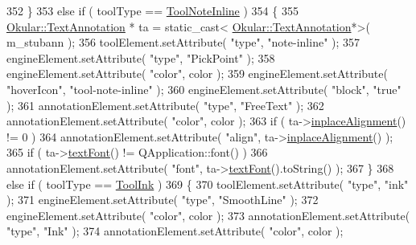 \begin{DoxyCode}
352     \}
353     \textcolor{keywordflow}{else} \textcolor{keywordflow}{if} ( toolType == \hyperlink{classEditAnnotToolDialog_ae4572c0cf4fc351cf03e4d86ef595a9ca198ea29d3ebd27d859c47c7d7e0499e2}{ToolNoteInline} )
354     \{
355         \hyperlink{classOkular_1_1TextAnnotation}{Okular::TextAnnotation} * ta = \textcolor{keyword}{static\_cast<}
      \hyperlink{classOkular_1_1TextAnnotation}{Okular::TextAnnotation}*\textcolor{keyword}{>}( m\_stubann );
356         toolElement.setAttribute( \textcolor{stringliteral}{"type"}, \textcolor{stringliteral}{"note-inline"} );
357         engineElement.setAttribute( \textcolor{stringliteral}{"type"}, \textcolor{stringliteral}{"PickPoint"} );
358         engineElement.setAttribute( \textcolor{stringliteral}{"color"}, color );
359         engineElement.setAttribute( \textcolor{stringliteral}{"hoverIcon"}, \textcolor{stringliteral}{"tool-note-inline"} );
360         engineElement.setAttribute( \textcolor{stringliteral}{"block"}, \textcolor{stringliteral}{"true"} );
361         annotationElement.setAttribute( \textcolor{stringliteral}{"type"}, \textcolor{stringliteral}{"FreeText"} );
362         annotationElement.setAttribute( \textcolor{stringliteral}{"color"}, color );
363         \textcolor{keywordflow}{if} ( ta->\hyperlink{classOkular_1_1TextAnnotation_ada96fce5c424867d6b48a8ae39a8cace}{inplaceAlignment}() != 0 )
364             annotationElement.setAttribute( \textcolor{stringliteral}{"align"}, ta->\hyperlink{classOkular_1_1TextAnnotation_ada96fce5c424867d6b48a8ae39a8cace}{inplaceAlignment}() );
365         \textcolor{keywordflow}{if} ( ta->\hyperlink{classOkular_1_1TextAnnotation_aa48f194058046e70141412a5e85e7199}{textFont}() != QApplication::font() )
366             annotationElement.setAttribute( \textcolor{stringliteral}{"font"}, ta->\hyperlink{classOkular_1_1TextAnnotation_aa48f194058046e70141412a5e85e7199}{textFont}().toString() );
367     \}
368     \textcolor{keywordflow}{else} \textcolor{keywordflow}{if} ( toolType == \hyperlink{classEditAnnotToolDialog_ae4572c0cf4fc351cf03e4d86ef595a9caef2e195c93ecc9f1d6bd1dae0deb5c19}{ToolInk} )
369     \{
370         toolElement.setAttribute( \textcolor{stringliteral}{"type"}, \textcolor{stringliteral}{"ink"} );
371         engineElement.setAttribute( \textcolor{stringliteral}{"type"}, \textcolor{stringliteral}{"SmoothLine"} );
372         engineElement.setAttribute( \textcolor{stringliteral}{"color"}, color );
373         annotationElement.setAttribute( \textcolor{stringliteral}{"type"}, \textcolor{stringliteral}{"Ink"} );
374         annotationElement.setAttribute( \textcolor{stringliteral}{"color"}, color );

\end{DoxyCode}
